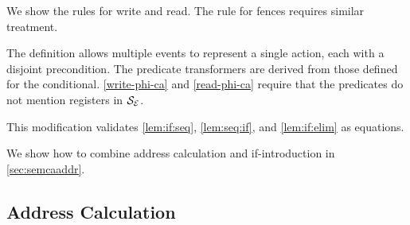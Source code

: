 
We show the rules for write and read.  The rule for fences requires similar treatment.
\begin{definition}
  \label{def:semca}
  
\end{definition}
The definition allows multiple events to represent a single action, each with
a disjoint precondition.  The predicate transformers are derived from those
defined for the conditional.
\ref{write-phi-ca} and \ref{read-phi-ca} require that the predicates do not
mention registers in $\mathcal{S}_{\mathcal{E}}$.


This modification validates
\ref{lem:if:seq}, \ref{lem:seq:if}, and \ref{lem:if:elim} as equations.

We show how to combine address calculation and if-introduction in
\textsection\ref{sec:semcaaddr}.

\subsection{Address Calculation}
\label{sec:addr}


